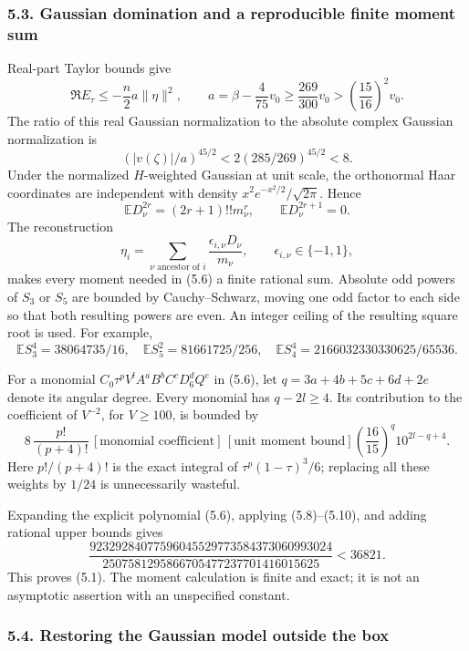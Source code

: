 \documentclass[
  11pt,
]{article}
\begin{document}
\subsubsection{5.3. Gaussian domination and a reproducible finite moment
sum}\label{gaussian-domination-and-a-reproducible-finite-moment-sum}

Real-part Taylor bounds give \[
 \Re E_\tau\le-\frac n2a\|\eta\|^2,
 \qquad a=\beta-\frac4{75}v_0\ge\frac{269}{300}v_0
                         >\left(\frac{15}{16}\right)^2v_0.
\] The ratio of this real Gaussian normalization to the absolute complex
Gaussian normalization is \[
 (|v(\zeta)|/a)^{45/2}<2(285/269)^{45/2}<8.                  \tag{5.7}
\] Under the normalized \(H\)-weighted Gaussian at unit scale, the
orthonormal Haar coordinates are independent with density
\(x^2e^{-x^2/2}/\sqrt{2\pi}\). Hence \[
 \mathbb ED_\nu^{2r}=(2r+1)!!m_\nu^r,
 \qquad \mathbb ED_\nu^{2r+1}=0.                              \tag{5.8}
\] The reconstruction \[
 \eta_i=\sum_{\nu\text{ ancestor of }i}
       \frac{\epsilon_{i,\nu}D_\nu}{m_\nu},\qquad
 \epsilon_{i,\nu}\in\{-1,1\},                                \tag{5.9}
\] makes every moment needed in (5.6) a finite rational sum. Absolute
odd powers of \(S_3\) or \(S_5\) are bounded by Cauchy--Schwarz, moving
one odd factor to each side so that both resulting powers are even. An
integer ceiling of the resulting square root is used. For example, \[
 \mathbb ES_3^4=38064735/16,\quad
 \mathbb ES_5^2=81661725/256,\quad
 \mathbb ES_4^4=2166032330330625/65536.
\]

For a monomial \(C_0\tau^pV^lA^aB^bC^cD_6^dQ^e\) in (5.6), let
\(q=3a+4b+5c+6d+2e\) denote its angular degree. Every monomial has
\(q-2l\ge4\). Its contribution to the coefficient of \(V^{-2}\), for
\(V\ge100\), is bounded by \[
 8\,\frac{p!}{(p+4)!}\,
 [\text{monomial coefficient}]\,[\text{unit moment bound}]
 \left(\frac{16}{15}\right)^q10^{2l-q+4}.                    \tag{5.10}
\] Here \(p!/(p+4)!\) is the exact integral of \(\tau^p(1-\tau)^3/6\);
replacing all these weights by \(1/24\) is unnecessarily wasteful.

Expanding the explicit polynomial (5.6), applying (5.8)--(5.10), and
adding rational upper bounds gives \[
 \frac{92329284077596045529773584373060993024}
 {2507581295866705477237701416015625}<36821.
\] This proves (5.1). The moment calculation is finite and exact; it is
not an asymptotic assertion with an unspecified constant.

\subsubsection{5.4. Restoring the Gaussian model outside the
box}\label{restoring-the-gaussian-model-outside-the-box}
\end{document}

